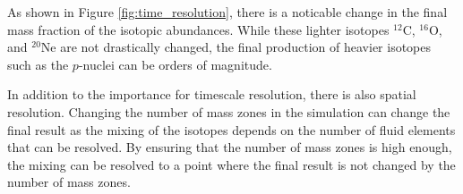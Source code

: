 As shown in Figure \ref{fig:time_resolution}, there is a noticable change in the final mass fraction of the isotopic abundances.
While these lighter isotopes $^{12}\mathrm{C}$, $^{16}\mathrm{O}$, and $^{20}\mathrm{Ne}$ are not drastically changed, the final production of heavier isotopes such as the $p$-nuclei can be orders of magnitude.

In addition to the importance for timescale resolution, there is also spatial resolution.
Changing the number of mass zones in the simulation can change the final result as the mixing of the isotopes depends on the number of fluid elements that can be resolved.
By ensuring that the number of mass zones is high enough, the mixing can be resolved to a point where the final result is not changed by the number of mass zones.